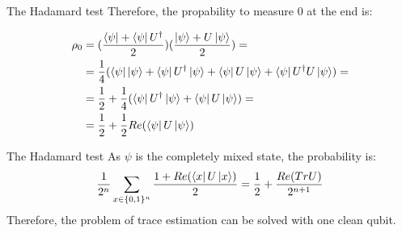 \documentclass[leqno,fleqn]{beamer}
\begin{document}
\begin{frame}[label={sec:orgheadline10}]{The Hadamard test}
Therefore, the propability to measure 0 at the end is:

\begin{align*}
\rho_{0} &= (\frac{\left\langle{\psi}\right\vert + \left\langle{\psi}\right\vert U^\dagger}{2})(\frac{\left\vert{\psi}\right\rangle + U\left\vert{\psi}\right\rangle}{2}) = \\
    &= \frac{1}{4}(\left\langle{\psi}\right\vert\left\vert{\psi}\right\rangle + \left\langle{\psi}\right\vert U^\dagger\left\vert{\psi}\right\rangle + \left\langle{\psi}\right\vert U\left\vert{\psi}\right\rangle + \left\langle{\psi}\right\vert U^\dagger U\left\vert{\psi}\right\rangle) = \\
    &= \frac{1}{2} + \frac{1}{4}(\left\langle{\psi}\right\vert U^\dagger\left\vert{\psi}\right\rangle + \left\langle{\psi}\right\vert U\left\vert{\psi}\right\rangle) = \\
    &=  \frac{1}{2} + \frac{1}{2}Re(\left\langle{\psi}\right\vert U\left\vert{\psi}\right\rangle)
\end{align*}
\end{frame}
\begin{frame}[label={sec:orgheadline11}]{The Hadamard test}
As \(\psi\) is the completely mixed state, the probability is: \\
\begin{align*}
  \frac{1}{2^{n}}\sum_{x \in \{0,1\}^n}{\frac{1+Re(\left\langle{x}\right\vert U\left\vert{x}\right\rangle)}{2}} = \frac{1}{2} + \frac{Re(TrU)}{2^{n+1}}
\end{align*}
Therefore, the problem of trace estimation can be solved with one clean qubit.
\end{frame}
\end{document}
